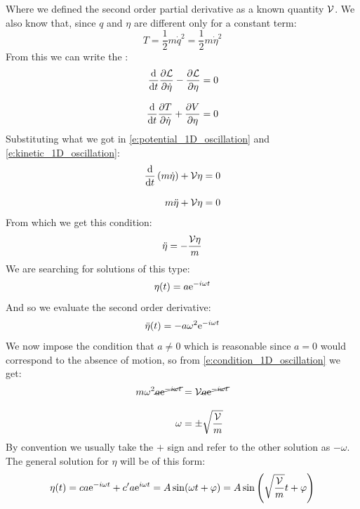 Where we defined the second order partial derivative as a known quantity $\mathcal{V}$. We also know that, since $q$ and $\eta$ are different only for a constant term:
\begin{equation} \label{e:kinetic_1D_oscillation}
    T = \dfrac{1}{2}m\dot{q}^2 = \dfrac{1}{2}m\dot{\eta}^2
\end{equation}
From this we can write the \eleref :
\begin{equation}
    \begin{split}
        \dv{}{t}\pdv{\lagr}{\dot{\eta}} -\pdv{\lagr}{\eta} = 0 \\[8pt]
        \dv{}{t}\pdv{T}{\dot{\eta}} + \pdv{V}{\eta} = 0
    \end{split}
\end{equation}
Substituting what we got in \eqref{e:potential_1D_oscillation} and \eqref{e:kinetic_1D_oscillation}:
\begin{equation}
    \begin{split}
        \dv{}{t}\brackets{m\dot{\eta}} + \Velegant\eta &= 0\\[8pt]
        m\ddot{\eta} + \Velegant\eta &= 0
    \end{split}
\end{equation}
From which we get this condition:
\begin{equation} \label{e:condition_1D_oscillation}
    \ddot{\eta} =- \dfrac{\mathcal{V}\eta}{m}
\end{equation}
We are searching for solutions of this type:
\begin{equation}
    \eta (t) = a\mathrm{e}^{-i\omega t}
\end{equation}
And so we evaluate the second order derivative:
\begin{eqnarray}
    \ddot{\eta} (t) = -a\omega^2\mathrm{e}^{-i\omega t}
\end{eqnarray}
We now impose the condition that $a\neq 0$ which is reasonable since $a=0$ would correspond to the absence of motion, so from \eqref{e:condition_1D_oscillation} we get:
\begin{equation}
    \begin{split}
        m\omega^2\cancel{a\mathrm{e}^{-i\omega t}} &= \mathcal{V}\cancel{a\mathrm{e}^{-i\omega t}}\\[8pt]
        \omega &= \pm \sqrt{\dfrac{\mathcal{V}}{m}}
    \end{split}
\end{equation}
By convention we usually take the $+$ sign and refer to the other solution as $-\omega$. The general solution for $\eta$ will be of this form:
\begin{equation}
    \eta (t) = ca\mathrm{e}^{-i\omega t} + c'a\mathrm{e}^{i\omega t} = A \sin(\omega t + \varphi) = A \sin\left(\sqrt{\dfrac{\mathcal{V}}{m}} t + \varphi\right)
\end{equation}
